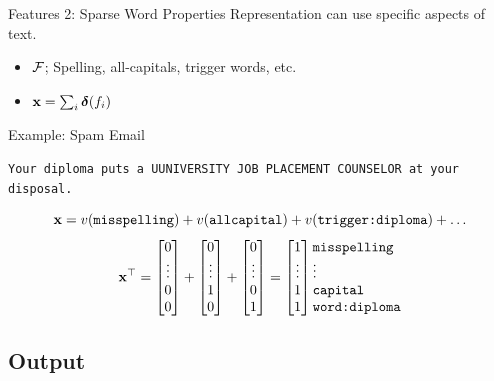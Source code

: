 \documentclass{beamer}
\begin{document}
\begin{frame}{Features 2: Sparse Word Properties}
  Representation can use specific aspects of text.
  \begin{itemize}
  \item $\mathcal{F}$; Spelling, all-capitals, trigger words, etc. 
  \item $\mathbf{x} = \sum_{i} \boldsymbol{\delta}(f_i)$ 
  \end{itemize}

  Example: Spam Email

  \begin{center}
    \texttt{Your diploma puts a UUNIVERSITY JOB PLACEMENT COUNSELOR at
      your disposal.}
  \end{center}
  \[  \mathbf{x} = v(\texttt{misspelling}) + v(\texttt{allcapital}) + v(\texttt{trigger:diploma}) + \ldots\]
  \[
  \boldx^\top = 
 \begin{bmatrix} 0 \\ \vdots \\ 0\\  0 \\  \end{bmatrix} + 
 \begin{bmatrix} 0 \\ \vdots \\ 1\\ 0 \\  \end{bmatrix} +
 \begin{bmatrix} 0 \\ \vdots \\ 0\\  1 \\  \end{bmatrix} = 
 \begin{bmatrix} 1 \\ \vdots \\ 1 \\ 1 \\  \end{bmatrix}     \begin{matrix*}[l] \mathrm{\texttt{misspelling}} \\ \vdots \\ \mathrm{\texttt{capital}} \\ \mathrm{\texttt{word:diploma}} \\ \end{matrix*}
  \]
\end{frame}

\subsection{Output}
\end{document}
